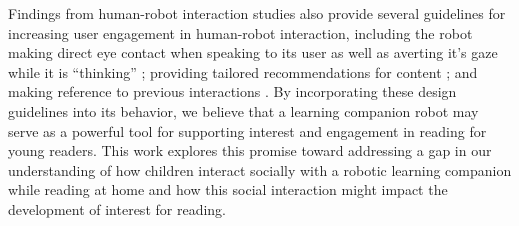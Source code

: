 \documentclass{sigchi}
\begin{document}
Findings from human-robot interaction studies also provide several guidelines for increasing user engagement in human-robot interaction, including the robot making direct eye contact when speaking to its user \cite{mutlu2006storytelling, mutlu2012conversational} as well as averting it's gaze while it is ``thinking'' \cite{Andrist:2014}; providing tailored recommendations for content \cite{Lim:2013}; and making reference to previous interactions \cite{Leite:2009}. By incorporating these design guidelines into its behavior, we believe that a learning companion robot may serve as a powerful tool for supporting interest and engagement in reading for young readers. This work explores this promise toward addressing a gap in our understanding of how children interact socially with a robotic learning companion while reading at home and how this social interaction might impact the development of interest for reading.





\end{document}
